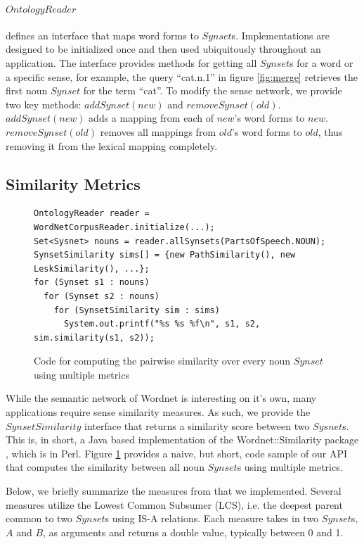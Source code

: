 \documentclass[a4paper,11pt]{article}
\begin{document}
\paragraph{$OntologyReader$} defines an interface that maps word forms to $Synset$s.  Implementations are designed to be initialized once and then used ubiquitously throughout an application.  The interface provides methods for getting all $Synset$s for a word or a specific sense, for
example, the query ``cat.n.1'' in figure \ref{fig:merge} retrieves the first noun $Synset$ for the term ``cat''.  
To modify the sense network, we provide two key methods: $addSynset(new)$ and $removeSynset(old)$.  $addSynset(new)$ adds a mapping from each of $new$'s word forms to $new$. $removeSynset(old)$ removes all mappings from $old$'s word forms to $old$, thus removing it from the lexical mapping completely.

\subsection{Similarity Metrics}

\begin{figure}
\small
\begin{verbatim}
OntologyReader reader = WordNetCorpusReader.initialize(...);
Set<Sysnet> nouns = reader.allSynsets(PartsOfSpeech.NOUN);
SynsetSimilarity sims[] = {new PathSimilarity(), new LeskSimilarity(), ...};
for (Synset s1 : nouns)
  for (Synset s2 : nouns)
    for (SynsetSimilarity sim : sims)
      System.out.printf("%s %s %f\n", s1, s2, sim.similarity(s1, s2));
\end{verbatim}
\caption{Code for computing the pairwise similarity over every noun $Synset$ using multiple metrics}
\label{fig:sim}
\end{figure}

While the semantic network of Wordnet is interesting on it's own, many
applications require sense similarity measures.  As such, we provide the
$SynsetSimilarity$ interface that
returns a similarity score between two $Sysnet$s.  This is, in short, a Java
based implementation of the Wordnet::Similarity package \cite{pedersen04sim}, which is in
Perl.  Figure \ref{fig:sim} provides a naive, but short, code sample of our API that computes the similarity between all noun $Synset$s using multiple metrics.

Below, we briefly summarize the measures from \cite{pedersen04sim} that we implemented. Several measures utilize the Lowest Common Subsumer (LCS), i.e. the deepest parent common to two $Synset$s using IS-A relations. Each measure takes in two $Synset$s, $A$ and $B$, as arguments and returns a double value, typically between 0 and 1.
\end{document}
